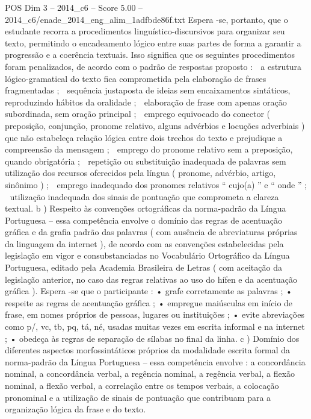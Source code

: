 \begin{textsample}{POS Dim 3 – 2014\_c6 – Score 5.00 – 2014\_c6/enade\_2014\_eng\_alim\_1adfbde86f.txt}
Espera -se, portanto, que o estudante recorra a procedimentos linguístico-discursivos para organizar seu texto, permitindo o encadeamento lógico entre suas partes de forma a garantir a progressão e a coerência textuais.
Isso significa que os seguintes procedimentos foram penalizados, de acordo com o padrão de respostas proposto :  a estrutura lógico-gramatical do texto fica comprometida pela elaboração de frases fragmentadas ;  sequência justaposta de ideias sem encaixamentos sintáticos, reproduzindo hábitos da oralidade ;  elaboração de frase com apenas oração subordinada, sem oração principal ;  emprego equivocado do conector ( preposição, conjunção, pronome relativo, alguns advérbios e locuções adverbiais ) que não estabeleça relação lógica entre dois trechos do texto e prejudique a compreensão da mensagem ;  emprego do pronome relativo sem a preposição, quando obrigatória ;  repetição ou substituição inadequada de palavras sem utilização dos recursos oferecidos pela língua ( pronome, advérbio, artigo, sinônimo ) ;  emprego inadequado dos pronomes relativos “ cujo(a) ” e “ onde ” ;  utilização inadequada dos sinais de pontuação que comprometa a clareza textual. b ) Respeito às convenções ortográficas da norma-padrão da Língua Portuguesa – essa competência envolve o domínio das regras de acentuação gráfica e da grafia padrão das palavras ( com ausência de abreviaturas próprias da linguagem da internet ), de acordo com as convenções estabelecidas pela legislação em vigor e consubstanciadas no Vocabulário Ortográfico da Língua Portuguesa, editado pela Academia Brasileira de Letras ( com aceitação da legislação anterior, no caso das regras relativas ao uso do hífen e da acentuação gráfica ).
Espera -se que o participante : • grafe corretamente as palavras ; • respeite as regras de acentuação gráfica ; • empregue maiúsculas em início de frase, em nomes próprios de pessoas, lugares ou instituições ; • evite abreviações como p/, vc, tb, pq, tá, né, usadas muitas vezes em escrita informal e na internet ; • obedeça às regras de separação de sílabas no final da linha. c ) Domínio dos diferentes aspectos morfossintáticos próprios da modalidade escrita formal da norma-padrão da Língua Portuguesa – essa competência envolve : a concordância nominal, a concordância verbal, a regência nominal, a regência verbal, a flexão nominal, a flexão verbal, a correlação entre os tempos verbais, a colocação pronominal e a utilização de sinais de pontuação que contribuam para a organização lógica da frase e do texto.

\end{textsample}
